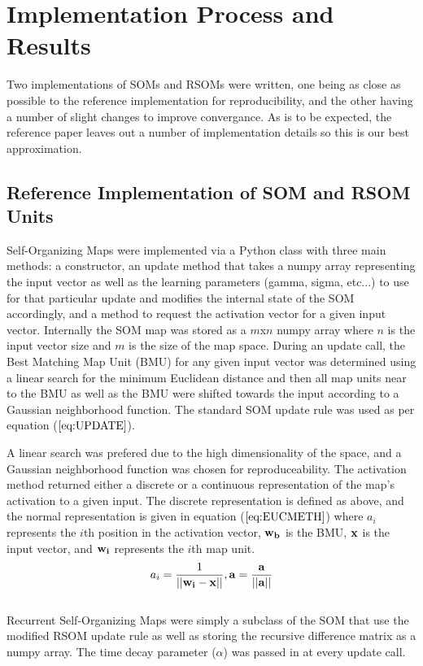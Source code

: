 \documentclass[a4paper,10pt]{article}
\begin{document}
\section{Implementation Process and Results}
Two implementations of SOMs and RSOMs were written, one being as close as possible
to the reference implementation for reproducibility, and the other having a number of slight
changes to improve convergance.  As is to be expected, the reference paper leaves out a
number of implementation details so this is our best approximation.
\subsection{Reference Implementation of SOM and RSOM Units}
Self-Organizing Maps were implemented via a Python class with three main methods: a constructor,
an update method that takes a numpy array representing the input vector as well as the learning
parameters (gamma, sigma, etc...) to use for that particular update and modifies the internal state
of the SOM accordingly, and a method to request the activation vector for a given input vector.
Internally the SOM map was stored
as a $m$x$n$ numpy array where $n$ is the input vector size and $m$ is the size of the map space. 
During an update call, the Best Matching Map Unit (BMU) for any given input vector was determined
using a linear search for the minimum Euclidean distance and then all map units near to the BMU as
well as the BMU were shifted towards the input according to a Gaussian neighborhood function.  The
standard SOM update rule was used as per equation ($\ref{eq:UPDATE}$).
 
A linear search was prefered due to the high dimensionality of the space, and a Gaussian
neighborhood function was chosen for reproduceability.  The activation method returned either a
discrete or a continuous representation of the map's activation to a given input. The discrete
representation is defined as above, and the normal representation is given in equation
($\ref{eq:EUCMETH}$) where $a_i$ represents the $i$th position in the activation vector,
$\bold{w_b}$ is the BMU, $\bold{x}$ is the input vector, and $\bold{w_i}$ represents the $i$th map
unit.
\begin{equation} \label{eq:EUCMETH}
 a_i = \frac{1}{||\bold{w_i}-\bold{x}||}, \bold{a} = \frac{\bold{a}}{||\bold{a}||}
\end{equation}
\\
Recurrent Self-Organizing Maps were simply a subclass of the SOM that use the modified RSOM update
rule as well as storing the recursive difference matrix as a numpy array.  The time decay parameter
($\alpha$) was passed in at every update call.
\end{document}
